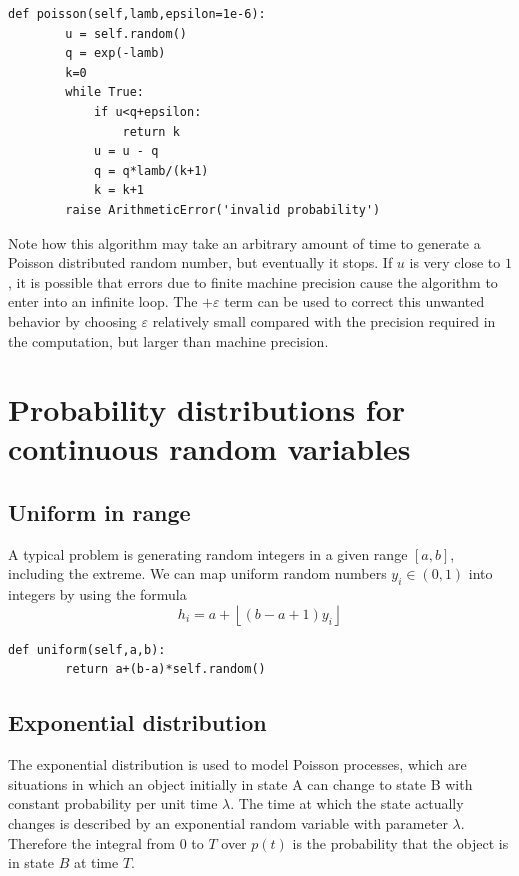 \documentclass[justified,sixbynine]{tufte-book}
\def\ft{\small\tt}
\theoremstyle{plain}%
\theoremstyle{definition}
\theoremstyle{remark}
\begin{document}
\begin{fullwidth}
\begin{lstlisting}[caption={in file: {\ft nlib.py}}]
    def poisson(self,lamb,epsilon=1e-6):
        u = self.random()
        q = exp(-lamb)
        k=0
        while True:
            if u<q+epsilon:
                return k
            u = u - q
            q = q*lamb/(k+1)
            k = k+1
        raise ArithmeticError('invalid probability')
\end{lstlisting}

Note how this algorithm may take an arbitrary amount of time to generate a
Poisson distributed random number, but eventually it stops. If $u$ is very
close to $1$, it is possible that errors due to finite machine precision
cause the algorithm to enter into an infinite loop. The $+\varepsilon $ term
can be used to correct this unwanted behavior by choosing $\varepsilon$ relatively small compared with the precision required in the computation, but
larger than machine precision.

\goodbreak\section{Probability distributions for continuous random variables}

\goodbreak\subsection{Uniform in range}

A typical problem is generating random integers in a given range $[a,b]$,
including the extreme. We can map uniform random numbers $y_i\in (0,1)$
into integers by using the formula
\begin{equation}
h_i=a+\left\lfloor (b-a+1)y_i\right\rfloor
\end{equation}

\begin{lstlisting}[caption={in file: {\ft nlib.py}}]
    def uniform(self,a,b):
        return a+(b-a)*self.random()
\end{lstlisting}

\goodbreak\subsection{Exponential distribution}

The exponential distribution is used to model Poisson processes, which are
situations in which an object initially in state A can change to state B
with constant probability per unit time $\lambda $. The time at which the
state actually changes is described by an exponential random variable with
parameter $\lambda $. Therefore the integral from $0$ to $T$ over $p(t)$ is
the probability that the object is in state $B$ at time $T$.


\end{fullwidth}
\end{document}
